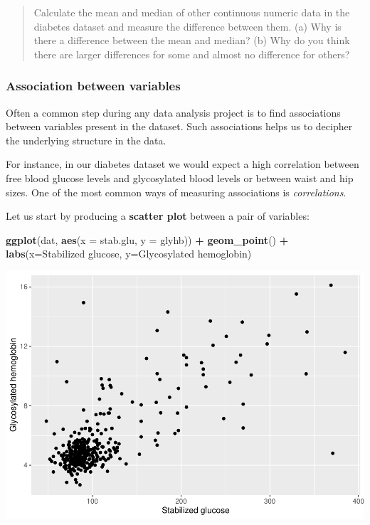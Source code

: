 \documentclass[
]{book}
\newenvironment{Shaded}{\begin{snugshade}}{\end{snugshade}}
\newcommand{\AttributeTok}[1]{\textcolor[rgb]{0.13,0.29,0.53}{#1}}
\newcommand{\FunctionTok}[1]{\textcolor[rgb]{0.13,0.29,0.53}{\textbf{#1}}}
\newcommand{\NormalTok}[1]{#1}
\newcommand{\SpecialCharTok}[1]{\textcolor[rgb]{0.81,0.36,0.00}{\textbf{#1}}}
\newcommand{\StringTok}[1]{\textcolor[rgb]{0.31,0.60,0.02}{#1}}
\begin{document}
\begin{quote}
Calculate the mean and median of other continuous numeric data in the diabetes dataset and measure the difference between them. (a) Why is there a difference between the mean and median? (b) Why do you think there are larger differences for some and almost no difference for others?
\end{quote}

\hypertarget{association-between-variables}{%
\subsubsection{Association between variables}\label{association-between-variables}}

Often a common step during any data analysis project is to find associations between variables present in the dataset. Such associations helps us to decipher the underlying structure in the data.

For instance, in our diabetes dataset we would expect a high correlation between free blood glucose levels and glycosylated blood levels or between waist and hip sizes. One of the most common ways of measuring associations is \emph{correlations}.

Let us start by producing a \textbf{scatter plot} between a pair of variables:

\begin{Shaded}
\begin{Highlighting}[]
\FunctionTok{ggplot}\NormalTok{(dat,}
       \FunctionTok{aes}\NormalTok{(}\AttributeTok{x =}\NormalTok{ stab.glu, }\AttributeTok{y =}\NormalTok{ glyhb)) }\SpecialCharTok{+}
  \FunctionTok{geom\_point}\NormalTok{() }\SpecialCharTok{+}
  \FunctionTok{labs}\NormalTok{(}\AttributeTok{x=}\StringTok{\textquotesingle{}Stabilized glucose\textquotesingle{}}\NormalTok{, }\AttributeTok{y=}\StringTok{\textquotesingle{}Glycosylated hemoglobin\textquotesingle{}}\NormalTok{)}
\end{Highlighting}
\end{Shaded}

\includegraphics{_main_files/figure-latex/unnamed-chunk-55-1.pdf}
\end{document}
